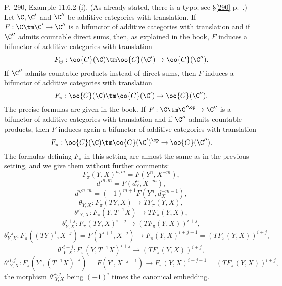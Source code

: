 \documentclass[12pt]{article}
\theoremstyle{remark}
\theoremstyle{definition}
\begin{document}
\begin{s}%
P.~290, Example 11.6.2 (i). (As already stated, there is a typo; see \S\ref{290} p.~.) Let $\C,\C'$ and $\C''$ be additive categories with translation. If $F:\C\tm\C'\to\C''$ is a bifunctor of additive categories with translation and if $\C''$ admits countable direct sums, then, as explained in the book, $F$ induces a bifunctor of additive categories with translation 
$$
F_\oplus:\oo{C}(\C)\tm\oo{C}(\C')\to\oo{C}(\C'').
$$ 
If $\C''$ admits countable products instead of direct sums, then $F$ induces a bifunctor of additive categories with translation 
$$
F_\pi:\oo{C}(\C)\tm\oo{C}(\C')\to\oo{C}(\C'').
$$ 
The precise formulas are given in the book. If $F:\C\tm\C'^\op\to\C''$ is a bifunctor of additive categories with translation and if $\C''$ admits countable products, then $F$ induces again a bifunctor of additive categories with translation 
$$
F_\pi:\oo{C}(\C)\tm\oo{C}(\C')^{\op}\to\oo{C}(\C'').
$$ 
The formulas defining $F_\pi$ in this setting are almost the same as in the previous setting, and we give them without further comments:
$$
F_\pi(Y,X)^{n,m}=F(Y^n,X^{-m}),
$$
$$
d'^{n,m}=F(d_Y^n,X^{-m}),
$$
$$
d''^{n,m}=(-1)^{m+1}F(Y^n,d_X^{-m-1}),
$$
$$
\theta_{Y,X}:F_\pi(TY,X)\to TF_\pi(Y,X),
$$
$$
\theta'_{Y,X}:F_\pi(Y,T^{-1}X)\to TF_\pi(Y,X),
$$
$$
\theta_{Y,X}^{i+j}:F_\pi(TY,X)^{i+j}\to(TF_\pi(Y,X))^{i+j},
$$
$$
\theta_{Y,X}^{i,j}:F_\pi((TY)^i,X^{-j})=F(Y^{i+1},X^{-j})\to F_\pi(Y,X)^{i+j+1}=(TF_\pi(Y,X))^{i+j},
$$
$$
{\theta'}_{Y,X}^{i+j}:F_\pi(Y,T^{-1}X)^{i+j}\to(TF_\pi(Y,X))^{i+j},
$$
$$
{\theta'}_{Y,X}^{i,j}:F_\pi(Y^i,(T^{-1}X)^{-j})=F(Y^i,X^{-j-1})\to F_\pi(Y,X)^{i+j+1}=(TF_\pi(Y,X))^{i+j},
$$
the morphism ${\theta'}_{Y,X}^{i,j}$ being $(-1)^i$ times the canonical embedding. 
\end{s}

%
\end{document}
